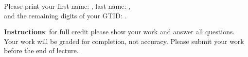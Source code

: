 \documentclass[12pt]{exam}
\begin{document}
    
\vspace*{-1cm}

\begin{center}
{\Large \TestName}
\end{center}
\newcommand{\ID}{Please print your first name: \framebox{\strut\hspace{4.2cm}}, last name: \framebox{\strut\hspace{4.2cm}}, \\[2pt] and the remaining digits of your GTID:  \framebox{\strut $9$}\framebox{\strut $0$}\framebox{\strut\hspace{0.19cm}}\framebox{\strut\hspace{0.19cm}}\framebox{\strut\hspace{0.19cm}}\framebox{\strut\hspace{0.19cm}}\framebox{\strut\hspace{0.19cm}}\framebox{\strut\hspace{0.19cm}}\framebox{\strut\hspace{0.19cm}}.}

\ID

\vspace{6pt}
\textbf{Instructions}: for full credit please show your work and answer all questions. Your work will be graded for completion, not accuracy. Please submit your work before the end of lecture. 
\end{document}
